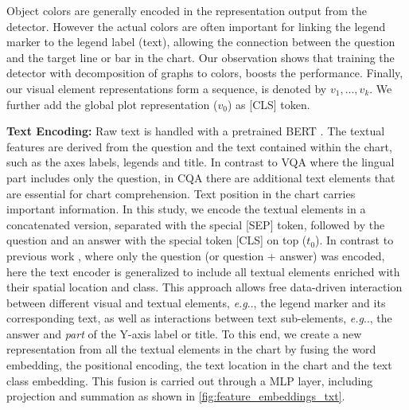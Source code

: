 \documentclass[runningheads]{llncs}
\makeatletter
\DeclareRobustCommand\onedot{\futurelet\@let@token\@onedot}
\def\@onedot{\ifx\@let@token.\else.\null\fi\xspace}
\def\eg{\emph{e.g}\onedot} \def\Eg{\emph{E.g}\onedot}
\makeatother
\begin{document}
Object colors are generally encoded in the representation output from the detector. However the actual colors are often important for linking the legend marker to the legend label (text), allowing the connection between the question and the target line or bar in the chart. Our observation shows that training the detector with decomposition of graphs to colors, boosts the performance.
Finally, our visual element representations form a sequence, is denoted by ${v_1, ..., v_k}$.
We further add the global plot representation ($v_0$) as [CLS] token.

{\bf Text Encoding:} Raw text is handled with a pretrained BERT \cite{devlin2019bert}. The textual features are derived from the question and the text contained within the chart, such as the axes labels, legends and title. In contrast to VQA where the lingual part includes only the question, in CQA there are additional text elements that are essential for chart comprehension. Text position in the chart carries important information.
In this study, we encode the textual elements in a concatenated version, separated with the special [SEP] token, followed by the question and an answer with the special token [CLS] on top ($t_0$). In contrast to previous work \cite{vilbert,chartqa, dvqa, figureqa, yang2016stacked}, where only the question (or question + answer) was encoded, here the text encoder is generalized to include all textual elements enriched with their spatial location and class. This approach allows free data-driven interaction between different visual and textual elements, \eg, the legend marker and its corresponding text, as well as interactions between text sub-elements, \eg, the answer and {\it part} of the Y-axis label or title. To this end, we create a new representation from all the textual elements in the chart by fusing the word embedding, the positional encoding, the text location in the chart and the text class embedding. This fusion is carried out through a MLP layer, including projection and summation as shown in \cref{fig:feature_embeddings_txt}. 
\end{document}
